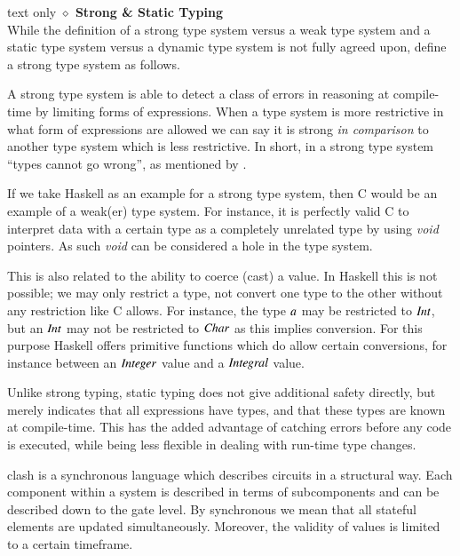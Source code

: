 \begin{changemargin}{1cm}{0cm}
\begin{expansionno}{text only}%
\noindent \textbf{$\diamond$ Strong \& Static Typing} \\
While the definition of a strong type system versus a weak type system and a static type system versus a dynamic type system is not fully agreed upon, \citeauthor{o2009real} define\cite{o2009real} a strong type system as follows.

A strong type system is able to detect a class of errors in reasoning at compile-time by limiting forms of expressions.
When a type system is more restrictive in what form of expressions are allowed we can say it is strong \textit{in comparison} to another type system which is less restrictive.
In short, in a strong type system ``types cannot go wrong''\cite{milner1978theory}, as mentioned by \citeauthor{milner1978theory}.

If we take Haskell as an example for a strong type system, then C\cite{kernighan2009c} would be an example of a weak(er) type system. 
For instance, it is perfectly valid C to interpret data with a certain type as a completely unrelated type by using \textit{void} pointers. 
As such \textit{void} can be considered a hole in the type system.

This is also related to the ability to coerce (cast) a value. 
In Haskell this is not possible; we may only restrict a type, not convert one type to the other without any restriction like C allows.
For instance, the type \ensuremath{\Varid{a}} may be restricted to \ensuremath{\Conid{Int}}, but an \ensuremath{\Conid{Int}} may not be restricted to \ensuremath{\Conid{Char}} as this implies conversion.
For this purpose Haskell offers primitive functions which do allow certain conversions, for instance between an \ensuremath{\Conid{Integer}} value and a \ensuremath{\Conid{Integral}} value.

Unlike strong typing, static typing does not give additional safety directly, but merely indicates that all expressions have types, and that these types are known at compile-time.
This has the added advantage of catching errors before any code is executed, while being less flexible in dealing with run-time type changes. 
\end{expansionno}
\end{changemargin}

\gls{clash} is a synchronous language which describes circuits in a structural way.
Each component within a system is described in terms of subcomponents and can be described down to the gate level. 
By synchronous we mean that all stateful elements are updated simultaneously.
Moreover, the validity of values is limited to a certain timeframe.

